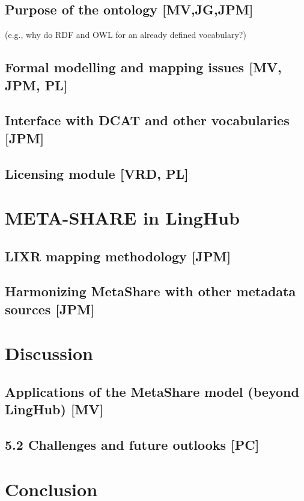 \documentclass{llncs}
\begin{document}
\subsection{Purpose of the ontology [MV,JG,JPM]}
(e.g., why do RDF and OWL for an already defined vocabulary?) 
\subsection{Formal modelling and mapping issues [MV, JPM, PL]}
\subsection{Interface with DCAT and other vocabularies [JPM]}
\subsection{Licensing module [VRD, PL]}
\section{META-SHARE in LingHub}
\subsection{LIXR mapping methodology [JPM]}
\subsection{Harmonizing MetaShare with other metadata sources [JPM]}
\section{Discussion}
\subsection{Applications of the MetaShare model (beyond LingHub) [MV]}
\subsection{5.2 Challenges and future outlooks [PC]}
\section{Conclusion}



\end{document}
